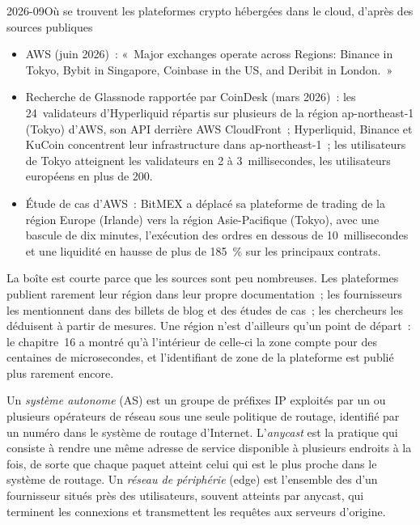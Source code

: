 \begin{dated}{2026-09}{Où se trouvent les plateformes crypto hébergées dans le cloud, d'après des sources publiques}\label{dat:nw:where-the-crypto-venues-live:venues}
\begin{itemize}
\item AWS (juin 2026)~: «~Major exchanges operate across Regions: Binance in Tokyo, Bybit in Singapore, Coinbase in the US, and Deribit in London.~»
\item Recherche de Glassnode rapportée par CoinDesk (mars 2026)~: les 24~validateurs d'Hyperliquid répartis sur plusieurs 
  de la région ap-northeast-1 (Tokyo) d'AWS, son API derrière AWS CloudFront~; Hyperliquid, Binance et KuCoin concentrent leur infrastructure dans ap-northeast-1~;
  les utilisateurs de Tokyo atteignent les validateurs en 2 à 3~millisecondes, les utilisateurs européens en plus de 200.
\item Étude de cas d'AWS~: BitMEX a déplacé sa plateforme de trading de la région Europe (Irlande) vers la région Asie-Pacifique (Tokyo), avec une bascule de dix minutes,
  l'exécution des ordres en dessous de 10~millisecondes et une liquidité en hausse de plus de 185~\% sur les principaux contrats.
\end{itemize}
\end{dated}

La boîte est courte parce que les sources sont peu nombreuses. Les plateformes publient rarement leur région dans leur propre documentation~; les fournisseurs les mentionnent
dans des billets de blog et des études de cas~; les chercheurs les déduisent à partir de mesures. Une région n'est d'ailleurs qu'un point de départ~: le chapitre~16 a montré qu'à l'intérieur de celle-ci la zone
compte pour des centaines de microsecondes, et l'identifiant de zone de la plateforme est publié plus rarement encore.

\begin{definition}\label{def:nw:where-the-crypto-venues-live:as}
Un \emph{système autonome} (AS) est un groupe de préfixes IP exploités par un ou plusieurs opérateurs de réseau sous une seule politique de routage,
identifié par un numéro dans le système de routage d'Internet. L'\emph{anycast} est la pratique qui consiste à rendre une même adresse de service
disponible à plusieurs endroits à la fois, de sorte que chaque paquet atteint celui qui est le plus proche dans le système de routage. Un \emph{réseau de
périphérie} (edge) est l'ensemble des  d'un fournisseur situés près des utilisateurs, souvent atteints par anycast, qui terminent les connexions
et transmettent les requêtes aux serveurs d'origine.
\end{definition}

